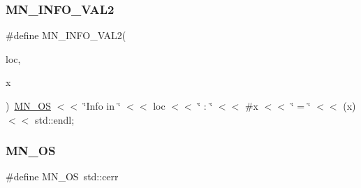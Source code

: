\mbox{\label{adat-devel_2other__libs_2minuit_2inc_2Minuit2_2MnPrint_8h_a1ee56f7f1e6b1358861d449482e3eea4}} 
\subsubsection{\texorpdfstring{MN\_INFO\_VAL2}{MN\_INFO\_VAL2}}
{\footnotesize\ttfamily \#define M\+N\+\_\+\+I\+N\+F\+O\+\_\+\+V\+A\+L2(\begin{DoxyParamCaption}\item[{}]{loc,  }\item[{}]{x }\end{DoxyParamCaption})~\mbox{\hyperlink{adat__devel__install_2include_2Minuit2_2MnPrint_8h_af76e3743f54c9064bb3fb3270edf5896}{M\+N\+\_\+\+OS}} $<$$<$ \char`\"{}Info in \char`\"{} $<$$<$ loc $<$$<$ \char`\"{} \+: \char`\"{} $<$$<$ \#x $<$$<$ \char`\"{} = \char`\"{} $<$$<$ (x) $<$$<$ std\+::endl;}

\mbox{\label{adat-devel_2other__libs_2minuit_2inc_2Minuit2_2MnPrint_8h_af76e3743f54c9064bb3fb3270edf5896}} 
\subsubsection{\texorpdfstring{MN\_OS}{MN\_OS}}
{\footnotesize\ttfamily \#define M\+N\+\_\+\+OS~std\+::cerr}

